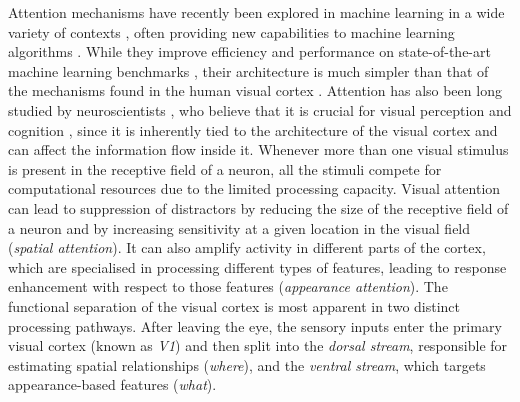     
    Attention mechanisms have recently been explored in machine learning in a wide variety of contexts \cite{Vinyals2014, Jaderberg2015}, often providing new capabilities to machine learning algorithms \cite{Graves2016dnc,Gregor2016towards, Eslami2016air}. While they improve efficiency \cite{Graves2014recurrent} and performance on state-of-the-art machine learning benchmarks \cite{Vinyals2014}, their architecture is much simpler than that of the mechanisms found in the human visual cortex \cite{Dayan2001}. Attention has also been long studied by neuroscientists \cite{Ungerleider2000}, who believe that it is crucial for visual perception and cognition \cite{Olshausen2016foveal}, since it is inherently tied to the architecture of the visual cortex and can affect the information flow inside it. Whenever more than one visual stimulus is present in the receptive field of a neuron, all the stimuli compete for computational resources due to the limited processing capacity. 
	Visual attention can lead to suppression of distractors by reducing the size of the receptive field of a neuron and by increasing sensitivity at a given location in the visual field (\emph{spatial attention}). It can also amplify activity in different parts of the cortex, which are
	specialised in processing different types of features, leading to  response enhancement with respect to those features (\emph{appearance attention}).
	The functional separation of the visual cortex is most apparent in two distinct processing pathways. After leaving the eye, the sensory inputs enter the primary visual cortex (known as \emph{V1}) and then split into the \emph{dorsal stream}, responsible for estimating spatial relationships (\emph{where}), and the \emph{ventral stream}, which targets appearance-based features (\emph{what}).

